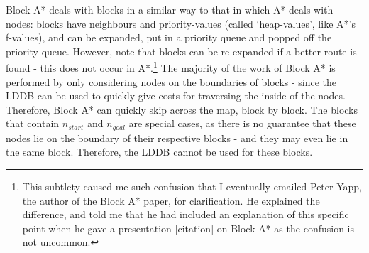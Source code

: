 \documentclass[12pt,notitlepage]{report}
\begin{document}
\noindent
Block A* deals with blocks in a similar way to that in which A* deals with nodes: blocks have neighbours and priority-values (called `heap-values', like A*'s f-values), and can be expanded, put in a priority queue and popped off the priority queue. However, note that blocks can be re-expanded if a better route is found - this does not occur in A*.\footnote{This subtlety caused me such confusion that I eventually emailed Peter Yapp, the author of the Block A* paper, for clarification. He explained the difference, and told me that he had included an explanation of this specific point when he gave a presentation [citation] on Block A* as the confusion is not uncommon.} The majority of the work of Block A* is performed by only considering nodes on the boundaries of blocks - since the LDDB can be used to quickly give costs for traversing the inside of the nodes. Therefore, Block A* can quickly skip across the map, block by block. The blocks that contain {$n_{start}$} and {$n_{goal}$} are special cases, as there is no guarantee that these nodes lie on the boundary of their respective blocks - and they may even lie in the same block. Therefore, the LDDB cannot be used for these blocks.\\
\end{document}
